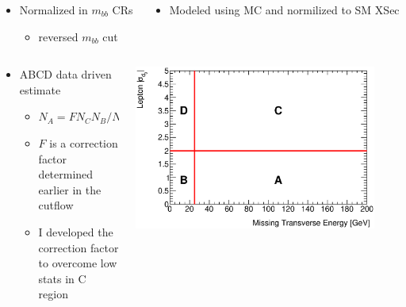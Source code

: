 \documentclass{beamer}
\newcommand*{\ttbar}{\ensuremath{t\bar{t}}\xspace}
\newcommand*{\header}[1]{\fontsize{16}{8}\selectfont \textbf{{\color{MyPurple}{#1}}}}
\begin{document}
\begin{frame}
\begin{center}
\header{Resolved Background Determination}
\end{center}
\begin{columns}
\begin{column}{0.5\textwidth}
\color{MyPurple}{\ttbar}
\begin{itemize}
\item Normalized in $m_{bb}$ CRs
\begin{itemize}
\item reversed $m_{bb}$ cut
\end{itemize}
\end{itemize}
\end{column}
\begin{column}{0.5\textwidth}
\color{MyPurple}{Other MC Bkg.}
\begin{itemize}
\item Modeled using MC and normilized to SM XSec
\end{itemize}
\end{column}
\end{columns}
\begin{center}
\color{MyPurple}{QCD multi-jet background}
\end{center}
\begin{columns}
\begin{column}{0.5\textwidth}
\begin{itemize}
\vspace{-0.5cm}
\item ABCD data driven estimate
\begin{itemize}
\item $N_A = F N_C N_B / N_D$
\item $F$ is a correction factor determined earlier in the cutflow
\item I developed the correction factor to overcome low stats in C region
\end{itemize}
\end{itemize}
\end{column}
\begin{column}{0.5\textwidth}
\includegraphics[width=0.9\textwidth]{figures/abcdExample_met_vs_d0sigBL20}
\end{column}
\end{columns}
\end{frame}
\end{document}
